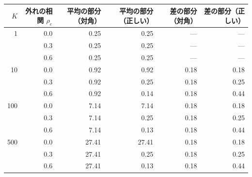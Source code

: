 \begin{tabular}{rrrrrr}
\toprule
$K$ & 外れの相関 $\rho_e$ & 平均の部分（対角） & 平均の部分（正しい） & 差の部分（対角） & 差の部分（正しい） \\
\midrule
1 & 0.0 & 0.25 & 0.25 & --- & --- \\
 & 0.3 & 0.25 & 0.25 & --- & --- \\
 & 0.6 & 0.25 & 0.25 & --- & --- \\
\midrule
10 & 0.0 & 0.92 & 0.92 & 0.18 & 0.18 \\
 & 0.3 & 0.92 & 0.25 & 0.18 & 0.25 \\
 & 0.6 & 0.92 & 0.14 & 0.18 & 0.44 \\
\midrule
100 & 0.0 & 7.14 & 7.14 & 0.18 & 0.18 \\
 & 0.3 & 7.14 & 0.25 & 0.18 & 0.25 \\
 & 0.6 & 7.14 & 0.13 & 0.18 & 0.44 \\
\midrule
500 & 0.0 & 27.41 & 27.41 & 0.18 & 0.18 \\
 & 0.3 & 27.41 & 0.25 & 0.18 & 0.25 \\
 & 0.6 & 27.41 & 0.13 & 0.18 & 0.44 \\
\bottomrule
\end{tabular}

